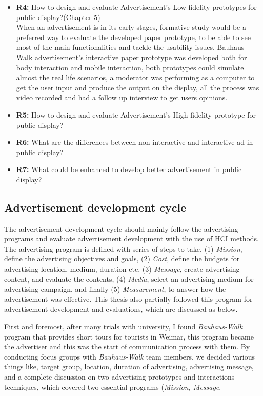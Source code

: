 \begin{itemize}
\item \textbf{R4: }How to design and evaluate Advertisement's Low-fidelity prototypes for public display?(Chapter 5) \\
When an advertisement is in its early stages, formative study would be a preferred way to evaluate the developed paper prototype, to be able to see most of the main functionalities and tackle the usability issues. Bauhaus-Walk advertisement’s interactive paper prototype was developed both for body interaction and mobile interaction, both prototypes could simulate almost the real life scenarios, a moderator was performing as a computer to get the user input and produce the output on the display, all the process was video recorded and had a follow up interview to get users opinions. 


\item \textbf{R5: }How to design and evaluate Advertisement's High-fidelity prototype for public display?
\item \textbf{R6: }What are the differences between non-interactive and interactive ad in public display?
\item \textbf{R7: }What could be enhanced to develop better advertisement in public display? 

\end{itemize}
\fi

\subsection{Advertisement development cycle}
The advertisement development cycle should mainly follow the advertising programs\cite{ad_def} and evaluate advertisement development with the use of HCI methods. The advertising program is defined with series of steps to take, (1) \emph{Mission}, define the advertising objectives and goals, (2) \emph{Cost}, define the budgets for advertising location, medium, duration etc, (3) \emph{Message}, create advertising content, and evaluate the contents, (4) \emph{Media}, select an advertising medium for advertising campaign, and finally (5) \emph{Measurement}, to answer how the advertisement was effective. This thesis also partially followed this program for advertisement development and evaluations, which are discussed as below.


First and foremost, after many trials with university, I found \emph{Bauhaus-Walk} program that provides short tours for tourists in Weimar, this program became the advertiser and this was the start of communication process with them. By conducting focus groups with \emph{Bauhaus-Walk} team members, we decided various things like, target group, location, duration of advertising, advertising message, and a complete discussion on two advertising prototypes and interactions techniques, which covered two essential programs (\emph{Mission, Message}.

